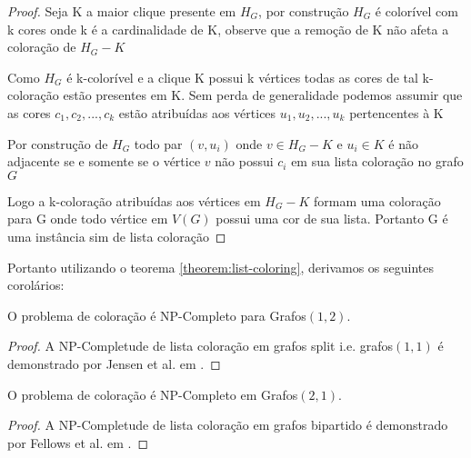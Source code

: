 \begin{proof}
	Seja K a maior clique presente em $H_G$, por construção $H_G$ é colorível com k cores onde k é a cardinalidade de K, observe que a remoção de K não afeta a coloração de $H_G - K$
	
	Como $H_G$ é k-colorível e a clique K possui k vértices todas as cores de tal k-coloração estão presentes em K. Sem perda de generalidade podemos assumir que as cores $c_1,c_2,...,c_k$ estão atribuídas aos vértices $u_1,u_2,...,u_k$ pertencentes à K
	
	Por construção de $H_G$ todo par $(v,u_i)$ onde $v \in H_G - K$ e $u_i \in K$ é não adjacente se e somente se o vértice $v$ não possui $c_i$ em sua lista coloração no grafo $G$
	
	Logo a k-coloração atribuídas aos vértices em $H_G - K$ formam uma coloração para G onde todo vértice em $V(G)$ possui uma cor de sua lista. Portanto G é uma instância sim de lista coloração
\end{proof}
Portanto utilizando o teorema \ref{theorem:list-coloring}, derivamos os seguintes corolários:
\begin{corolario}
	O problema de coloração é NP-Completo para Grafos$(1,2)$.
	\begin{proof}
		A NP-Completude de lista coloração em grafos split i.e. grafos$(1,1)$ é demonstrado por Jensen et al. em \cite{jansen1997}.
	\end{proof}
\end{corolario}
\begin{corolario}
	O problema de coloração é NP-Completo em Grafos$(2,1)$.
	\begin{proof}
		A NP-Completude de lista coloração em grafos bipartido é demonstrado por Fellows et al. em \cite{fellows07}.
	\end{proof}
\end{corolario}    
